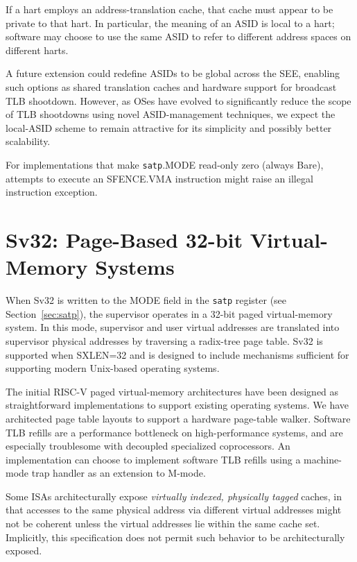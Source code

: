 If a hart employs an address-translation cache, that cache must appear to be
private to that hart.
In particular, the meaning of an ASID is local to a hart; software may choose
to use the same ASID to refer to different address spaces on different harts.

\begin{commentary}
A future extension could redefine ASIDs to be global across the SEE, enabling
such options as shared translation caches and hardware support for broadcast
TLB shootdown.
However, as OSes have evolved to significantly reduce the scope of TLB
shootdowns using novel ASID-management techniques, we expect the local-ASID
scheme to remain attractive for its simplicity and possibly better
scalability.
\end{commentary}

For implementations that make {\tt satp}.MODE read-only zero (always Bare), attempts to
execute an SFENCE.VMA instruction might raise an illegal instruction
exception.

\section{Sv32: Page-Based 32-bit Virtual-Memory Systems}
\label{sec:sv32}

When Sv32 is written to the MODE field in the {\tt satp} register (see
Section~\ref{sec:satp}), the supervisor operates in a 32-bit paged
virtual-memory system.  In this mode, supervisor and user virtual addresses
are translated into supervisor physical addresses by traversing a radix-tree
page table.  Sv32 is supported when SXLEN=32 and is designed to include
mechanisms sufficient for supporting modern Unix-based operating systems.

\begin{commentary}
The initial RISC-V paged virtual-memory architectures have been
designed as straightforward implementations to support existing
operating systems.  We have architected page table layouts to support
a hardware page-table walker.  Software TLB refills are a performance
bottleneck on high-performance systems, and are especially troublesome
with decoupled specialized coprocessors.  An implementation can choose
to implement software TLB refills using a machine-mode trap handler as
an extension to M-mode.
\end{commentary}

\begin{commentary}
Some ISAs architecturally expose \emph{virtually indexed, physically tagged}
caches, in that accesses to the same physical address via different virtual
addresses might not be coherent unless the virtual addresses lie within the
same cache set.
Implicitly, this specification does not permit such behavior to be
architecturally exposed.
\end{commentary}

